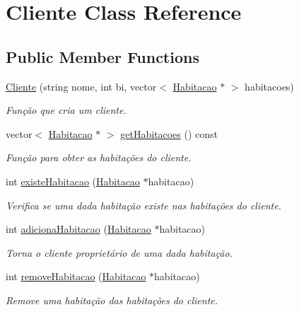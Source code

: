 \hypertarget{class_cliente}{}\section{Cliente Class Reference}
\label{class_cliente}
\subsection*{Public Member Functions}
\begin{DoxyCompactItemize}
\item 
\hyperlink{class_cliente_a2bccaf416e225c0f925e69ec132f415a}{Cliente} (string nome, int bi, vector$<$ \hyperlink{class_habitacao}{Habitacao} $\ast$ $>$ habitacoes)
\begin{DoxyCompactList}\small\item\em Função que cria um cliente. \end{DoxyCompactList}\item 
vector$<$ \hyperlink{class_habitacao}{Habitacao} $\ast$ $>$ \hyperlink{class_cliente_a6625c1bb73828bcaa067f41b7590408f}{get\+Habitacoes} () const 
\begin{DoxyCompactList}\small\item\em Função para obter as habitações do cliente. \end{DoxyCompactList}\item 
int \hyperlink{class_cliente_a0ceeca7c7fd8910a7cd169b97cec7825}{existe\+Habitacao} (\hyperlink{class_habitacao}{Habitacao} $\ast$habitacao)
\begin{DoxyCompactList}\small\item\em Verifica se uma dada habitação existe nas habitações do cliente. \end{DoxyCompactList}\item 
int \hyperlink{class_cliente_a5e5c3a99a6b1941e481072240323a878}{adiciona\+Habitacao} (\hyperlink{class_habitacao}{Habitacao} $\ast$habitacao)
\begin{DoxyCompactList}\small\item\em Torna o cliente proprietário de uma dada habitação. \end{DoxyCompactList}\item 
int \hyperlink{class_cliente_af50893954314bc62ee0cef46e33bbb60}{remove\+Habitacao} (\hyperlink{class_habitacao}{Habitacao} $\ast$habitacao)
\begin{DoxyCompactList}\small\item\em Remove uma habitação das habitações do cliente. \end{DoxyCompactList}\item 

\end{DoxyCompactItemize}

